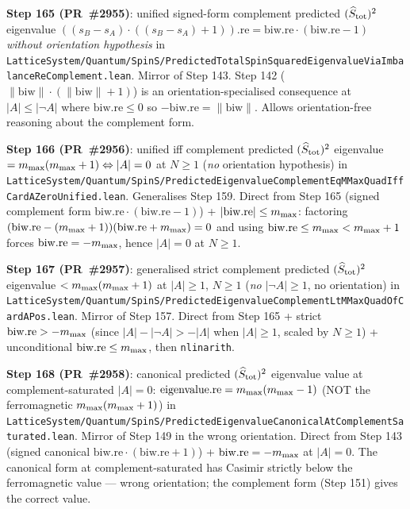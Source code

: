 \documentclass[a4paper,11pt]{article}
\begin{document}
\textbf{Step 165 (PR~\#2955)}: unified signed-form complement predicted
$(\widehat S_{\rm tot})^2$ eigenvalue
$((s_B - s_A)\cdot((s_B - s_A) + 1)).\mathrm{re} =
\mathrm{biw.re}\cdot(\mathrm{biw.re} - 1)$ \emph{without orientation
hypothesis} in
\texttt{LatticeSystem/Quantum/SpinS/PredictedTotalSpinSquaredEigenvalueViaImbalanceReComplement.lean}.
Mirror of Step 143. Step 142 ($\|\mathrm{biw}\|\cdot(\|\mathrm{biw}\|+1)$)
is an orientation-specialised consequence at $|A| \le |\neg A|$ where
$\mathrm{biw.re} \le 0$ so $-\mathrm{biw.re} = \|\mathrm{biw}\|$. Allows
orientation-free reasoning about the complement form.

\textbf{Step 166 (PR~\#2956)}: unified iff complement predicted
$(\widehat S_{\rm tot})^2$ eigenvalue
$= m_{\rm max}(m_{\rm max}+1) \Leftrightarrow |A| = 0$ at $N \ge 1$
(\emph{no} orientation hypothesis) in
\texttt{LatticeSystem/Quantum/SpinS/PredictedEigenvalueComplementEqMMaxQuadIffCardAZeroUnified.lean}.
Generalises Step 159. Direct from Step 165 (signed complement form
$\mathrm{biw.re}\cdot(\mathrm{biw.re}-1)$) + $|\mathrm{biw.re}| \le m_{\rm max}$:
factoring $(\mathrm{biw.re}-(m_{\rm max}+1))(\mathrm{biw.re}+m_{\rm max}) = 0$
and using $\mathrm{biw.re} \le m_{\rm max} < m_{\rm max}+1$ forces
$\mathrm{biw.re} = -m_{\rm max}$, hence $|A| = 0$ at $N \ge 1$.

\textbf{Step 167 (PR~\#2957)}: generalised strict complement predicted
$(\widehat S_{\rm tot})^2$ eigenvalue $< m_{\rm max}(m_{\rm max}+1)$
at $|A| \ge 1$, $N \ge 1$ (\emph{no} $|\neg A| \ge 1$, no orientation)
in
\texttt{LatticeSystem/Quantum/SpinS/PredictedEigenvalueComplementLtMMaxQuadOfCardAPos.lean}.
Mirror of Step 157. Direct from Step 165 + strict
$\mathrm{biw.re} > -m_{\rm max}$ (since $|A| - |\neg A| > -|\Lambda|$
when $|A| \ge 1$, scaled by $N \ge 1$) + unconditional
$\mathrm{biw.re} \le m_{\rm max}$, then \texttt{nlinarith}.

\textbf{Step 168 (PR~\#2958)}: canonical predicted $(\widehat S_{\rm tot})^2$
eigenvalue value at complement-saturated $|A| = 0$:
$\mathrm{eigenvalue.re} = m_{\rm max}(m_{\rm max} - 1)$ (NOT the
ferromagnetic $m_{\rm max}(m_{\rm max} + 1)$) in
\texttt{LatticeSystem/Quantum/SpinS/PredictedEigenvalueCanonicalAtComplementSaturated.lean}.
Mirror of Step 149 in the wrong orientation. Direct from Step 143
(signed canonical $\mathrm{biw.re}\cdot(\mathrm{biw.re}+1)$) +
$\mathrm{biw.re} = -m_{\rm max}$ at $|A| = 0$. The canonical form at
complement-saturated has Casimir strictly below the ferromagnetic
value — wrong orientation; the complement form (Step 151) gives the
correct value.
\end{document}
